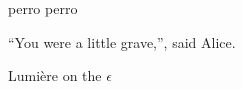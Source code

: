 \documentclass[a4paper, 12pt] {article}
\begin{document}
perro perro

``You were a little grave,'', said Alice.

Lumi\`{e}re on the $ \epsilon $ 
\end{document}
